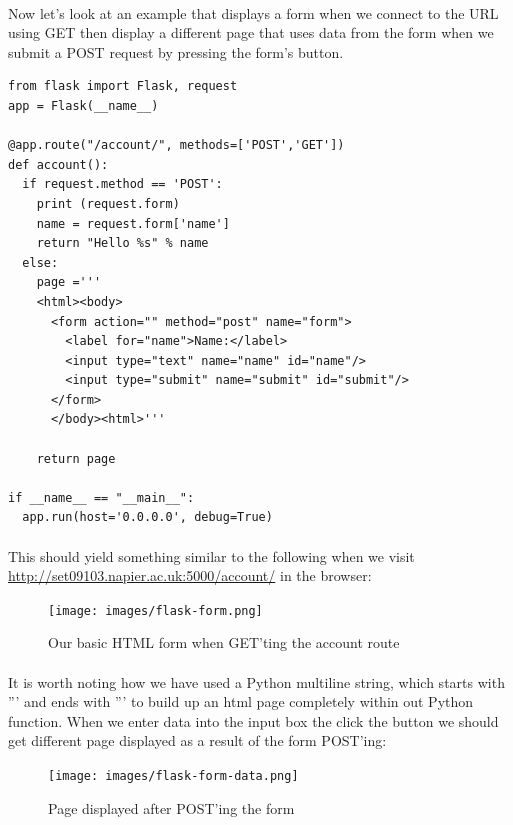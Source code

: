 \documentclass[12pt, a4paper, oneside]{book}
\begin{document}
{\paragraph{} Now let's look at an example that displays a form when we connect to the URL using GET then display a different page that uses data from the form when we submit a POST request by pressing the form's button.

\begin{lstlisting}
from flask import Flask, request
app = Flask(__name__)

@app.route("/account/", methods=['POST','GET'])
def account():
  if request.method == 'POST':
    print (request.form)
    name = request.form['name']
    return "Hello %s" % name
  else:
    page ='''
    <html><body>
      <form action="" method="post" name="form">
        <label for="name">Name:</label>
        <input type="text" name="name" id="name"/>
        <input type="submit" name="submit" id="submit"/>
      </form>
      </body><html>'''

    return page
    
if __name__ == "__main__":
  app.run(host='0.0.0.0', debug=True)
\end{lstlisting}

\paragraph{} This should yield something similar to the following when we visit \url{http://set09103.napier.ac.uk:5000/account/} in the browser:

\begin{figure}[H]
\centering
\texttt{[image: images/flask-form.png]}
\caption{Our basic HTML form when GET'ting the account route}
\label{fig:flask-form}
\end{figure}

\paragraph{} It is worth noting how we have used a Python multiline string, which starts with ''' and ends with ''' to build up an html page completely within out Python function. When we enter data into the input box the click the button we should get different page displayed as a result of the form POST'ing:

\begin{figure}[H]
\centering
\texttt{[image: images/flask-form-data.png]}
\caption{Page displayed after POST'ing the form}
\label{fig:flask-form-data}
\end{figure}



}
\end{document}
